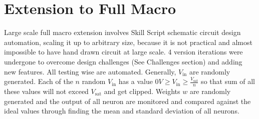 \section{Extension to Full Macro}
Large scale full macro extension involves Skill Script schematic circuit design automation, scaling it up to arbitrary size, because it is not practical and almost impossible to have hand drawn circuit at large scale. 4 version iterations were undergone to overcome design challenges (See Challenges section) and adding new features. All testing wise are automated. Generally, $V_{\text{in}}$ are randomly generated. Each of the $n$ random $V_{\text{in}}$ has a value $0V\geq V_{\text{in}} \geq \frac{V_{\text{sat}}}{n}$ so that sum of all these values will not exceed $V_{\text{sat}}$ and get clipped. Weights $w$ are randomly generated and the output of all neuron are monitored and compared against the ideal values through finding the mean and standard deviation of all neurons.
